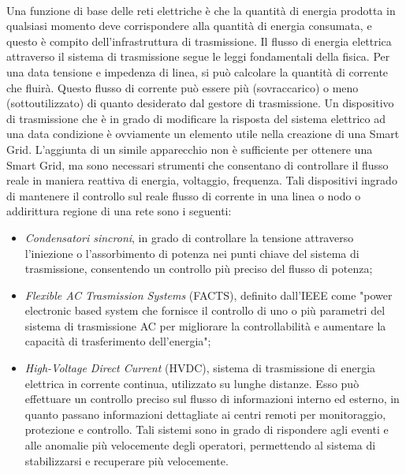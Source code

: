 \paragraph{}Una funzione di base delle reti elettriche è che la quantità di energia prodotta in qualsiasi momento deve corrispondere alla quantità di energia consumata, e questo è compito dell'infrastruttura di trasmissione. Il flusso di energia elettrica attraverso il sistema di trasmissione segue le leggi fondamentali della fisica. Per una data tensione e impedenza di linea, si può calcolare la quantità di corrente che fluirà. Questo flusso di corrente può essere più (sovraccarico) o meno (sottoutilizzato) di quanto desiderato dal gestore di trasmissione. Un dispositivo di trasmissione che è in grado di modificare  la risposta del sistema elettrico ad una data condizione è ovviamente un elemento utile nella creazione di una Smart Grid. L'aggiunta di un simile apparecchio non è sufficiente per ottenere una Smart Grid, ma sono necessari strumenti che consentano di controllare il flusso reale in maniera reattiva di energia, voltaggio, frequenza. Tali dispositivi in ​​grado di mantenere il controllo sul reale flusso di corrente in una linea o nodo o addirittura regione di una rete sono i seguenti:
\begin{itemize}
	\item \emph{Condensatori sincroni}, in grado di controllare la tensione attraverso l'iniezione o l'assorbimento di potenza nei punti chiave del sistema di trasmissione,  consentendo un controllo più preciso del flusso di potenza;
	\item \emph{Flexible AC Trasmission Systems} (FACTS), definito dall'IEEE come "power electronic based system che fornisce il controllo di uno o più parametri del sistema di trasmissione AC per migliorare la controllabilità e aumentare la capacità di trasferimento dell'energia"; 
	\item \emph{High-Voltage Direct Current} (HVDC), sistema di trasmissione di energia elettrica in corrente continua, utilizzato su lunghe distanze. Esso può effettuare un controllo preciso sul flusso di informazioni interno ed esterno, in quanto passano informazioni dettagliate ai centri remoti per monitoraggio, protezione e controllo. Tali sistemi sono in grado di rispondere agli eventi e alle anomalie più velocemente degli operatori, permettendo al sistema di stabilizzarsi e recuperare più velocemente.
\end{itemize}
